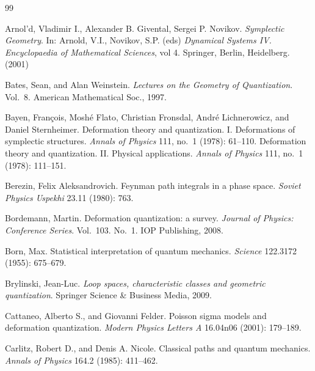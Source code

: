 
\begin{thebibliography}{99}
\small

Arnol'd, Vladimir I., Alexander B. Givental, Sergei P. Novikov.
\emph{Symplectic Geometry}. In: Arnold, V.I., Novikov, S.P. (eds)
\textit{Dynamical Systems IV. Encyclopaedia of Mathematical Sciences}, vol 4.
Springer, Berlin, Heidelberg. (2001)

Bates, Sean, and Alan Weinstein.
\emph{Lectures on the Geometry of Quantization}. Vol.~8. American Mathematical Soc., 1997.

Bayen, Fran\c{c}ois, Mosh\'e Flato, Christian Fronsdal, Andr\'e Lichnerowicz, and
Daniel Sternheimer.
Deformation theory and quantization. I. Deformations of symplectic structures.
\emph{Annals of Physics} 111, no.~1 (1978): 61--110.
Deformation theory and quantization. II. Physical applications.
\emph{Annals of Physics} 111, no.~1 (1978): 111--151.

Berezin, Felix Aleksandrovich.
Feynman path integrals in a phase space.
\emph{Soviet Physics Uspekhi} 23.11 (1980): 763.

Bordemann, Martin.
Deformation quantization: a survey.
\emph{Journal of Physics: Conference Series}. Vol.~103. No.~1. IOP Publishing, 2008.

Born, Max.
Statistical interpretation of quantum mechanics.
\emph{Science} 122.3172 (1955): 675--679.

Brylinski, Jean-Luc.
\emph{Loop spaces, characteristic classes and geometric quantization}.
Springer Science \& Business Media, 2009.

Cattaneo, Alberto S., and Giovanni Felder.
Poisson sigma models and deformation quantization.
\emph{Modern Physics Letters A} 16.04n06 (2001): 179--189.

Carlitz, Robert D., and Denis A. Nicole.
Classical paths and quantum mechanics.
\emph{Annals of Physics} 164.2 (1985): 411--462.


\end{thebibliography}
